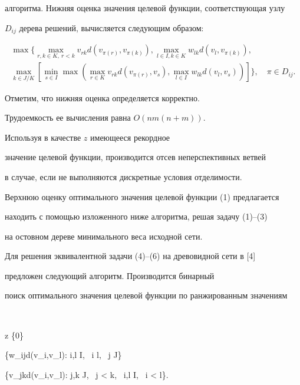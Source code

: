 алгоритма. Нижняя оценка значения целевой функции, соответствующая узлу


$D_{ij}$ дерева решений, вычисляется следующим образом:


\begin{gather*}


\max \{\max_{r,k \in K, \ r < k} v_{rk}d(v_{\pi(r)},v_{\pi(k)}),


\max_{l \in I, k \in K} w_{lk}d(v_{l},v_{\pi(k)}), \\


\max_{k \in J/K} [ \min_{s \in I} \max (


\max_{r \in K} v_{rk}d(v_{\pi(r)},v_{s}),


\max_{l \in I} w_{lk}d(v_{l},v_{s}))]\},\quad \pi \in D_{ij}.


\end{gather*}





Отметим, что нижняя оценка определяется корректно.


Трудоемкость ее вычисления равна $O(nm(n+m))$.





Используя в качестве $z$ имеющееся рекордное


значение целевой функции, производится отсев неперспективных ветвей


в случае, если не выполняются дискретные условия отделимости.





Верхнюю оценку оптимального значения целевой функции (1) предлагается


находить с помощью изложенного ниже алгоритма, решая задачу (1)--(3)


на остовном дереве минимального веса исходной сети.





Для решения эквивалентной задачи (4)--(6) на древовидной сети в [4] 


предложен следующий алгоритм. Производится бинарный 


поиск оптимального значения целевой функции по ранжированным значениям


$$


z \in \{0\} \cup


\{w_{ij}d(v_i,v_l): i,l \in I, \ i \neq l, \ j \in J\}  \cup 


\{v_{jk}d(v_i,v_l): j,k \in J, \ j < k, \ i,l \in I, \ i < l\}.



